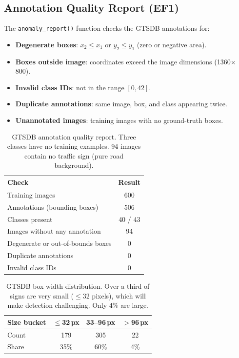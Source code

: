 \documentclass[12pt,a4paper]{article}
\begin{document}
\subsection{Annotation Quality Report (EF1)}

The \texttt{anomaly\_report()} function checks the GTSDB annotations for:

\begin{itemize}[leftmargin=2em, itemsep=2pt]
  \item \textbf{Degenerate boxes}: $x_2 \leq x_1$ or $y_2 \leq y_1$ (zero or negative area).
  \item \textbf{Boxes outside image}: coordinates exceed the image dimensions (1360$\times$800).
  \item \textbf{Invalid class IDs}: not in the range $[0, 42]$.
  \item \textbf{Duplicate annotations}: same image, box, and class appearing twice.
  \item \textbf{Unannotated images}: training images with no ground-truth boxes.
\end{itemize}

\begin{table}[H]
\centering
\renewcommand{\arraystretch}{1.3}
\begin{tabular}{lc}
\toprule
\textbf{Check} & \textbf{Result} \\
\midrule
Training images                   & 600 \\
Annotations (bounding boxes)      & 506 \\
Classes present                   & 40 / 43 \\
Images without any annotation     & 94 \\
Degenerate or out-of-bounds boxes & 0 \\
Duplicate annotations             & 0 \\
Invalid class IDs                 & 0 \\
\bottomrule
\end{tabular}
\caption{GTSDB annotation quality report. Three classes have no training examples. 94 images contain no traffic sign (pure road background).}
\label{tab:anomaly}
\end{table}

\begin{table}[H]
\centering
\renewcommand{\arraystretch}{1.3}
\begin{tabular}{lccc}
\toprule
\textbf{Size bucket} & \textbf{$\leq$32\,px} & \textbf{33--96\,px} & \textbf{$>$96\,px} \\
\midrule
Count & 179 & 305 & 22 \\
Share & 35\% & 60\% & 4\% \\
\bottomrule
\end{tabular}
\caption{GTSDB box width distribution. Over a third of signs are very small ($\leq$32 pixels), which will make detection challenging. Only 4\% are large.}
\label{tab:boxsizes}
\end{table}
\end{document}
